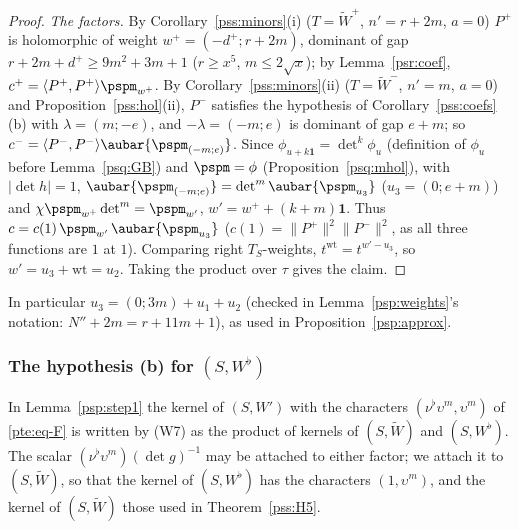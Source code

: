 \documentclass[10pt]{amsart}
\theoremstyle{definition}
\theoremstyle{remark}
\begin{document}
\begin{proof}
\emph{The factors.} By Corollary~\ref{pss:minors}(i) ($T=\widetilde W^+$, $n'=r+2m$, $a=0$) $P^+$ is holomorphic
of weight $w^+=(-d^+;r+2m)$, dominant of gap $r+2m+d^+\ge9m^2+3m+1$ ($r\ge x^5$, $m\le2\sqrt x$); by
Lemma~\ref{psr:coef}, $c^+=\langle P^+,P^+\rangle\pspm_{w^+}$. By Corollary~\ref{pss:minors}(ii)
($T=\widetilde W^-$, $n'=m$, $a=0$) and Proposition~\ref{pss:hol}(ii), $P^-$ satisfies the hypothesis of
Corollary~\ref{pss:coefs}(b) with $\lambda=(m;-e)$, and $-\lambda=(-m;e)$ is dominant of gap $e+m$; so
$c^-=\langle P^-,P^-\rangle\aubar{\pspm_{(-m;e)}}$. Since $\phi_{u+k\mathbf 1}=\det^k\phi_u$ (definition of $\phi_u$
before Lemma~\ref{psq:GB}) and $\pspm=\phi$ (Proposition~\ref{psq:mhol}), with $|\det h|=1$,
$\aubar{\pspm_{(-m;e)}}=\det^m\aubar{\pspm_{u_3}}$ ($u_3=(0;e+m)$) and $\chi\pspm_{w^+}\det^m=\pspm_{w'}$,
$w'=w^++(k+m)\mathbf 1$. Thus $c=c(1)\,\pspm_{w'}\,\aubar{\pspm_{u_3}}$ ($c(1)=\|P^+\|^2\|P^-\|^2$, as all
three functions are $1$ at $1$). Comparing right $T_S$-weights, $t^{\mathrm{wt}}=t^{w'-u_3}$, so $w'=u_3+
\mathrm{wt}=u_2$. Taking the product over $\tau$ gives the claim.
\end{proof}

\noindent In particular $u_3=(0;3m)+u_1+u_2$ (checked in Lemma~\ref{psp:weights}'s notation:
$N''+2m=r+11m+1$), as used in Proposition~\ref{psp:approx}.

\subsubsection{The hypothesis (b) for $(S,W^\flat)$}\label{pss:ss-b}

In Lemma~\ref{psp:step1} the kernel of $(S,W')$ with the characters $(\nu^\flat\upsilon^m,\upsilon^m)$ of
\eqref{pte:eq-F} is written by (W7) as the product of kernels of $(S,\widetilde W)$ and $(S,W^\flat)$. The scalar
$(\nu^\flat\upsilon^m)(\det g)^{-1}$ may be attached to either factor; we attach it to $(S,\widetilde W)$, so that the
kernel of $(S,W^\flat)$ has the characters $(1,\upsilon^m)$, and the kernel of $(S,\widetilde W)$ those used in
Theorem~\ref{pss:H5}.
\end{document}
